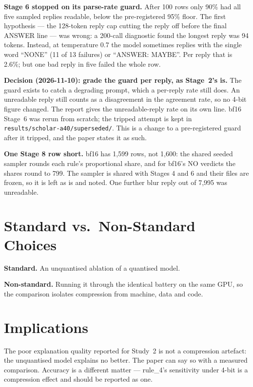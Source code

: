 \textbf{Stage 6 stopped on its parse-rate guard.} After 100 rows only 90\% had all five sampled replies
readable, below the pre-registered 95\% floor. The first hypothesis --- the 128-token reply cap cutting the
reply off before the final ANSWER line --- was wrong: a 200-call diagnostic found the longest reply was
94 tokens. Instead, at temperature 0.7 the model sometimes replies with the single word ``NONE'' (11 of 13
failures) or ``ANSWER: MAYBE''. Per reply that is 2.6\%; but one bad reply in five failed the whole row.

\textbf{Decision (2026-11-10): grade the guard per reply, as Stage~2's is.} The guard exists to catch a
degrading prompt, which a per-reply rate still does. An unreadable reply still counts as a disagreement in
the agreement rate, so no 4-bit figure changed. The report gives the unreadable-reply rate on its own line.
bf16 Stage~6 was rerun from scratch; the tripped attempt is kept in \texttt{results/scholar-a40/superseded/}.
This is a change to a pre-registered guard after it tripped, and the paper states it as such.

\textbf{One Stage 8 row short.} bf16 has 1,599 rows, not 1,600: the shared seeded sampler rounds each rule's
proportional share, and for bf16's NO verdicts the shares round to 799. The sampler is shared with Stages
4 and 6 and their files are frozen, so it is left as is and noted. One further blur reply out of 7,995 was
unreadable.

\section{Standard vs.\ Non-Standard Choices}

\textbf{Standard.} An unquantised ablation of a quantised model.

\textbf{Non-standard.} Running it through the identical battery on the same GPU, so the comparison isolates
compression from machine, data and code.

\section{Implications}

The poor explanation quality reported for Study~2 is not a compression artefact: the unquantised model
explains no better. The paper can say so with a measured comparison. Accuracy is a different matter ---
rule\_4's sensitivity under 4-bit is a compression effect and should be reported as one.
